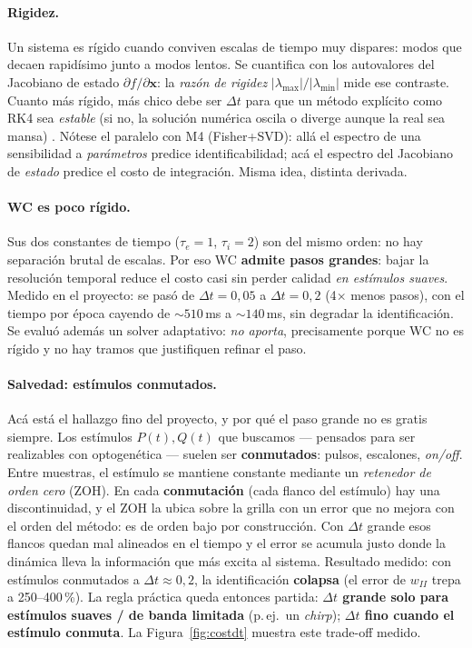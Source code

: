 \documentclass[11pt,a4paper]{article}
\begin{document}
\paragraph{Rigidez.} Un sistema es rígido cuando conviven escalas de tiempo muy dispares: modos que decaen rapidísimo junto a modos lentos. Se cuantifica con los autovalores del Jacobiano de estado $\partial f/\partial\mathbf{x}$: la \emph{razón de rigidez} $|\lambda_{\max}|/|\lambda_{\min}|$ mide ese contraste. Cuanto más rígido, más chico debe ser $\Delta t$ para que un método explícito como RK4 sea \emph{estable} (si no, la solución numérica oscila o diverge aunque la real sea mansa) \cite{kim2021}. Nótese el paralelo con M4 (Fisher+SVD): allá el espectro de una sensibilidad a \emph{parámetros} predice identificabilidad; acá el espectro del Jacobiano de \emph{estado} predice el costo de integración. Misma idea, distinta derivada.

\paragraph{WC es poco rígido.} Sus dos constantes de tiempo ($\tau_e=1$, $\tau_i=2$) son del mismo orden: no hay separación brutal de escalas. Por eso WC \textbf{admite pasos grandes}: bajar la resolución temporal reduce el costo casi sin perder calidad \emph{en estímulos suaves}. Medido en el proyecto: se pasó de $\Delta t=0{,}05$ a $\Delta t=0{,}2$ (4$\times$ menos pasos), con el tiempo por época cayendo de $\sim\!510$\,ms a $\sim\!140$\,ms, sin degradar la identificación. Se evaluó además un solver adaptativo: \emph{no aporta}, precisamente porque WC no es rígido y no hay tramos que justifiquen refinar el paso.

\paragraph{Salvedad: estímulos conmutados.} Acá está el hallazgo fino del proyecto, y por qué el paso grande no es gratis siempre. Los estímulos $P(t),Q(t)$ que buscamos --- pensados para ser realizables con optogenética --- suelen ser \textbf{conmutados}: pulsos, escalones, \emph{on/off}. Entre muestras, el estímulo se mantiene constante mediante un \emph{retenedor de orden cero} (ZOH). En cada \textbf{conmutación} (cada flanco del estímulo) hay una discontinuidad, y el ZOH la ubica sobre la grilla con un error que no mejora con el orden del método: es de orden bajo por construcción. Con $\Delta t$ grande esos flancos quedan mal alineados en el tiempo y el error se acumula justo donde la dinámica lleva la información que más excita al sistema. Resultado medido: con estímulos conmutados a $\Delta t\approx 0{,}2$, la identificación \textbf{colapsa} (el error de $w_{II}$ trepa a 250--400\,\%). La regla práctica queda entonces partida: \textbf{$\Delta t$ grande solo para estímulos suaves / de banda limitada} (p.\,ej.\ un \emph{chirp}); \textbf{$\Delta t$ fino cuando el estímulo conmuta}. La Figura~\ref{fig:costdt} muestra este trade-off medido.
\end{document}

